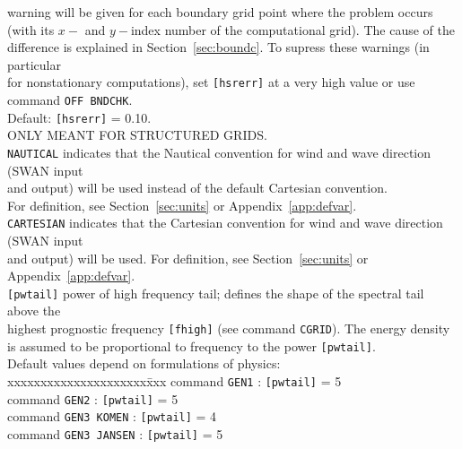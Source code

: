 \documentclass[12pt]{book}
\begin{document}
\begin{tabbing}
                   warning will be given for each boundary grid point where the problem occurs\\
                   (with its $x-$ and $y-$index number of the computational grid). The cause of the\\
                   difference is explained in Section~\ref{sec:boundc}. To supress these warnings (in particular\\
                   for nonstationary computations), set {\tt [hsrerr]} at a very high value or use\\
                   command {\tt OFF BNDCHK}.\\
                   Default: {\tt [hsrerr]} = 0.10.\\
                   ONLY MEANT FOR STRUCTURED GRIDS.\-\\
{\tt NAUTICAL}  \> indicates that the Nautical convention for wind and wave direction (SWAN input\+\\
                   and output) will be used instead of the default Cartesian convention.\\
                   For definition, see Section~\ref{sec:units} or Appendix~\ref{app:defvar}.\-\\
{\tt CARTESIAN} \> indicates that the Cartesian convention for wind and wave direction (SWAN input\+\\
                   and output) will be used. For definition, see Section~\ref{sec:units} or Appendix~\ref{app:defvar}.\-\\
{\tt [pwtail]}  \> power of high frequency tail; defines the shape of the spectral tail above the\+\\
                   highest prognostic frequency {\tt [fhigh]} (see command {\tt CGRID}). The energy density\\
                   is assumed to be proportional to frequency to the power {\tt [pwtail]}.\\
                   Default values depend on formulations of physics:\\
                   \pushtabs
                   xxxxxxxxxxxxxxxxxxxxx\=xxx \kill
                   command {\tt GEN1}        \>: {\tt [pwtail]} = 5\\
                   command {\tt GEN2}        \>: {\tt [pwtail]} = 5\\
                   command {\tt GEN3 KOMEN}  \>: {\tt [pwtail]} = 4\\
                   command {\tt GEN3 JANSEN} \>: {\tt [pwtail]} = 5\\

\end{tabbing}
\end{document}
